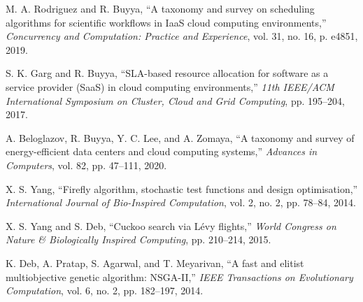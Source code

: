 \documentclass[conference]{IEEEtran}
\begin{document}
\begin{thebibliography}{1}
M. A. Rodriguez and R. Buyya, ``A taxonomy and survey on scheduling algorithms for scientific workflows in IaaS cloud computing environments,'' \emph{Concurrency and Computation: Practice and Experience}, vol. 31, no. 16, p. e4851, 2019.

S. K. Garg and R. Buyya, ``SLA-based resource allocation for software as a service provider (SaaS) in cloud computing environments,'' \emph{11th IEEE/ACM International Symposium on Cluster, Cloud and Grid Computing}, pp. 195--204, 2017.

A. Beloglazov, R. Buyya, Y. C. Lee, and A. Zomaya, ``A taxonomy and survey of energy-efficient data centers and cloud computing systems,'' \emph{Advances in Computers}, vol. 82, pp. 47--111, 2020.

X. S. Yang, ``Firefly algorithm, stochastic test functions and design optimisation,'' \emph{International Journal of Bio-Inspired Computation}, vol. 2, no. 2, pp. 78--84, 2014.

X. S. Yang and S. Deb, ``Cuckoo search via Lévy flights,'' \emph{World Congress on Nature \& Biologically Inspired Computing}, pp. 210--214, 2015.

K. Deb, A. Pratap, S. Agarwal, and T. Meyarivan, ``A fast and elitist multiobjective genetic algorithm: NSGA-II,'' \emph{IEEE Transactions on Evolutionary Computation}, vol. 6, no. 2, pp. 182--197, 2014.

\end{thebibliography}
\end{document}
